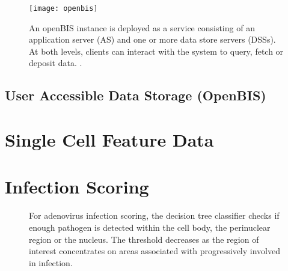 \begin{figure}
  \centering
  \texttt{[image: openbis]}
  \caption[Overview of the openBIS architecture and a more in-depth look at the data storage implementation.]{An openBIS instance is deployed as a service consisting of an application server (AS) and one or more data store servers (DSSs). At both levels, clients can interact with the system to query, fetch or deposit data. \citep{Bauch2011}.}
  \label{fig:openbis}
\end{figure}

\subsection{User Accessible Data Storage (OpenBIS)}


\section{Single Cell Feature Data}
\label{sec:scf-data}

\section{Infection Scoring}
\label{sec:infection-scoring}

\begin{figure}
\centering
{}
\caption[Decision tree for adenovirus infection scoring.]{For adenovirus infection scoring, the decision tree classifier checks if enough pathogen is detected within the cell body, the perinuclear region or the nucleus. The threshold decreases as the region of interest concentrates on areas associated with progressively involved in infection.}
\end{figure}

